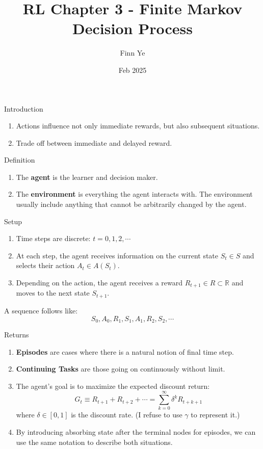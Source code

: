 \documentclass{beamer}
\title{RL Chapter 3 - Finite Markov Decision Process}
\author{Finn Ye}
\date{Feb 2025}
\newcommand{\RR}{\mathbb{R}}
\begin{document}
\frame{\titlepage}

\begin{frame}{Introduction}
\begin{enumerate}
    \item Actions influence not only immediate rewards, but also subsequent situations.
    \item Trade off between immediate and delayed reward.
\end{enumerate}
\end{frame}

\begin{frame}{Definition}
\begin{enumerate}
    \item The \textbf{agent} is the learner and decision maker.
    \item The \textbf{environment} is everything the agent interacts with. The environment usually include anything that cannot be arbitrarily changed by the agent.
\end{enumerate}
\end{frame}

\begin{frame}{Setup}
    \begin{enumerate}
        \item Time steps are discrete: $t=0,1,2,\cdots$
        \item At each step, the agent receives information on the current state $S_t\in S$ and selects their action $A_t \in A(S_t)$.
        \item Depending on the action, the agent receives a reward $R_{t+1}\in R\subset\RR$ and moves to the next state $S_{t+1}$.
    \end{enumerate}

    A sequence follows like:
    \[
    S_0,A_0,R_1,S_1,A_1,R_2,S_2,\cdots
    \]
\end{frame}

\begin{frame}{Returns}
    \begin{enumerate}
        \item \textbf{Episodes} are cases where there is a natural notion of final time step.
        \item \textbf{Continuing Tasks} are those going on continuously without limit.
        \item The agent's goal is to maximize the expected discount return:
        \[
        G_t \equiv R_{t+1} + R_{t+2} + \cdots = \sum_{k=0}^\infty \delta^k R_{t+k+1}
        \]
        where $\delta\in[0,1]$ is the discount rate. (I refuse to use $\gamma$ to represent it.)

        \item By introducing absorbing state after the terminal nodes for episodes, we can use the same notation to describe both situations.
    \end{enumerate}
\end{frame}
\end{document}
